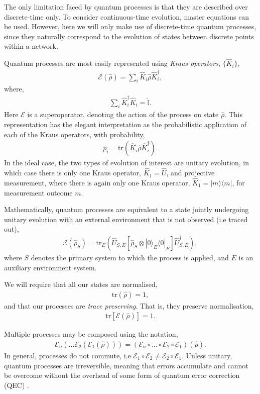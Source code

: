 \documentclass[aps,rmp,twocolumn,amsmath,amssymb,nofootinbib,superscriptaddress,longbibliography,floatfix]{revtex4-1}
\newcommand{\bra}[1]{\langle#1|}
\newcommand{\ket}[1]{|#1\rangle}
\begin{document}
The only limitation faced by quantum processes is that they are described over discrete-time only. To consider continuous-time evolution, master equations can be used. However, here we will only make use of discrete-time quantum processes, since they naturally correspond to the evolution of states between discrete points within a network.

Quantum processes are most easily represented using \emph{Kraus operators}, $\{\hat{K}_i\}$,
\begin{align}
\mathcal{E}(\hat\rho) = \sum_i \hat{K}_i \hat\rho \hat{K}_i^\dag,
\end{align}
where,
\begin{align}
\sum_i \hat{K}_i^\dag \hat{K}_i = \hat{\mathbb{I}}.
\end{align}
Here $\mathcal{E}$ is a superoperator, denoting the action of the process on state $\hat\rho$. This representation has the elegant interpretation as the probabilistic application of each of the Kraus operators, with probability,
\begin{align}
p_i = \mathrm{tr}(\hat{K}_i \hat\rho \hat{K}_i^\dag).
\end{align}
In the ideal case, the two types of evolution of interest are unitary evolution, in which case there is only one Kraus operator, \mbox{$\hat{K}_1=\hat{U}$}, and projective measurement, where there is again only one Kraus operator, \mbox{$\hat{K}_1=\ket{m}\bra{m}$}, for measurement outcome $m$.

Mathematically, quantum processes are equivalent to a state jointly undergoing unitary evolution with an external environment that is not observed (i.e traced out),
\begin{align} \label{eq:proc_environment}
\mathcal{E}(\hat\rho_S) = \mathrm{tr}_E (\hat{U}_{S,E} [\hat\rho_S\otimes \ket{0}_E\bra{0}_E] \hat{U}^\dag_{S,E}),
\end{align}
where $S$ denotes the primary system to which the process is applied, and $E$ is an auxiliary environment system.

We will require that all our states are normalised,
\begin{align}
\mathrm{tr}(\hat\rho) = 1,
\end{align}
and that our processes are \emph{trace preserving}. That is, they preserve normalisation,
\begin{align}
\mathrm{tr}[\mathcal{E}(\hat\rho)] = 1.
\end{align}

Multiple processes may be composed using the notation,
\begin{align}
\mathcal{E}_n(\dots \mathcal{E}_2(\mathcal{E}_1(\hat\rho)))=(\mathcal{E}_n \circ \dots \circ \mathcal{E}_2\circ\mathcal{E}_1)(\hat\rho).
\end{align}
In general, processes do not commute, i.e \mbox{$\mathcal{E}_1\circ \mathcal{E}_2 \neq \mathcal{E}_2\circ \mathcal{E}_1$}. Unless unitary, quantum processes are irreversible, meaning that errors accumulate and cannot be overcome without the overhead of some form of quantum error correction (QEC) \cite{bib:Shor95, bib:CalderbankShor96, bib:NielsenChuang00}.
\end{document}

